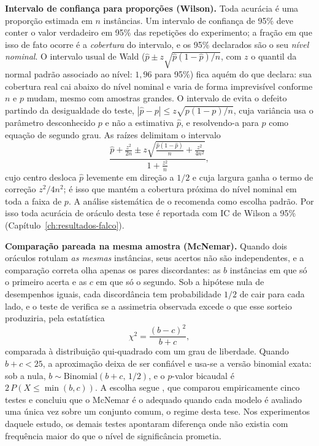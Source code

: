 \textbf{Intervalo de confiança para proporções (Wilson).} Toda acurácia é uma
proporção estimada em $n$ instâncias. Um intervalo de confiança de 95\% deve
conter o valor verdadeiro em 95\% das repetições do experimento; a fração em
que isso de fato ocorre é a \emph{cobertura} do intervalo, e os 95\%
declarados são o seu \emph{nível nominal}. O intervalo usual de Wald
($\hat{p} \pm z\sqrt{\hat{p}(1-\hat{p})/n}$, com $z$ o quantil da normal
padrão associado ao nível: $1{,}96$ para 95\%) fica aquém do que declara: sua
cobertura real cai abaixo do nível nominal e varia de forma imprevisível
conforme $n$ e $p$ mudam, mesmo com amostras grandes. O intervalo de
\citet{Wilson1927} evita o defeito partindo da desigualdade do teste,
$|\hat{p}-p| \le z\sqrt{p(1-p)/n}$, cuja variância usa o parâmetro
desconhecido $p$ e não a estimativa $\hat{p}$, e resolvendo-a para $p$ como
equação de segundo grau. As raízes delimitam o intervalo
\begin{equation}
\frac{\hat{p} + \frac{z^2}{2n} \pm z\sqrt{\frac{\hat{p}(1-\hat{p})}{n} + \frac{z^2}{4n^2}}}{1 + \frac{z^2}{n}},
\label{eq:wilson}
\end{equation}
cujo centro desloca $\hat{p}$ levemente em direção a $1/2$ e cuja largura
ganha o termo de correção $z^2/4n^2$; é isso que mantém a cobertura próxima
do nível nominal em toda a faixa de $p$. A análise sistemática de
\citet{Brown2001} o recomenda como escolha padrão. Por isso toda acurácia de
oráculo desta tese é reportada com IC de Wilson a 95\%
(Capítulo~\ref{ch:resultados-falco}).

\textbf{Comparação pareada na mesma amostra (McNemar).} Quando dois oráculos
rotulam \emph{as mesmas} instâncias, seus acertos não são independentes, e a
comparação correta olha apenas os pares discordantes: as $b$ instâncias em
que só o primeiro acerta e as $c$ em que só o segundo. Sob a hipótese nula de
desempenhos iguais, cada discordância tem probabilidade $1/2$ de cair para
cada lado, e o teste de \citet{McNemar1947} verifica se a assimetria
observada excede o que esse sorteio produziria, pela estatística
\begin{equation}
\chi^2 = \frac{(b-c)^2}{b+c},
\label{eq:mcnemar}
\end{equation}
comparada à distribuição qui-quadrado com um grau de liberdade. Quando
$b+c<25$, a aproximação deixa de ser confiável e usa-se a versão binomial
exata: sob a nula, $b \sim \mathrm{Binomial}(b+c,\,1/2)$, e o $p$-valor
bicaudal é $2\,P(X \le \min(b,c))$. A escolha segue \citet{Dietterich1998},
que comparou empiricamente cinco testes e concluiu que o McNemar é o adequado
quando cada modelo é avaliado uma única vez sobre um conjunto comum, o regime
desta tese. Nos experimentos daquele estudo, os demais testes apontaram
diferença onde não existia com frequência maior do que o nível de
significância prometia.

